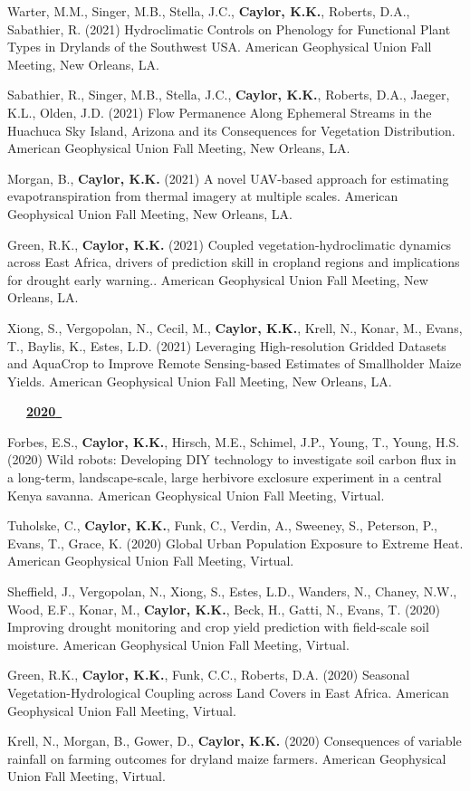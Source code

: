 \begin{etaremune}
\item Warter, M.M., Singer, M.B., Stella, J.C., \textbf{ Caylor, K.K.}, Roberts, D.A., Sabathier, R. (2021) Hydroclimatic Controls on Phenology for Functional Plant Types in Drylands of the Southwest USA. American Geophysical Union Fall Meeting, New Orleans, LA.
\item Sabathier, R., Singer, M.B., Stella, J.C., \textbf{ Caylor, K.K.}, Roberts, D.A., Jaeger, K.L., Olden, J.D. (2021) Flow Permanence Along Ephemeral Streams in the Huachuca Sky Island, Arizona and its Consequences for Vegetation Distribution. American Geophysical Union Fall Meeting, New Orleans, LA.
\item Morgan, B., \textbf{ Caylor, K.K.} (2021) A novel UAV-based approach for estimating evapotranspiration from thermal imagery at multiple scales. American Geophysical Union Fall Meeting, New Orleans, LA.
\item Green, R.K., \textbf{ Caylor, K.K.} (2021) Coupled vegetation-hydroclimatic dynamics across East Africa, drivers of prediction skill in cropland regions and implications for drought early warning.. American Geophysical Union Fall Meeting, New Orleans, LA.
\item Xiong, S., Vergopolan, N., Cecil, M., \textbf{ Caylor, K.K.}, Krell, N., Konar, M., Evans, T., Baylis, K., Estes, L.D. (2021) Leveraging High-resolution Gridded Datasets and AquaCrop to Improve Remote Sensing-based Estimates of Smallholder Maize Yields. American Geophysical Union Fall Meeting, New Orleans, LA.

\vspace{0.1in}
\mbox{\ \ \ \underline{\textbf{2020 }}}
\vspace{0.1in}

\item Forbes, E.S., \textbf{ Caylor, K.K.}, Hirsch, M.E., Schimel, J.P., Young, T., Young, H.S. (2020) Wild robots: Developing DIY technology to investigate soil carbon flux in a long-term, landscape-scale, large herbivore exclosure experiment in a central Kenya savanna. American Geophysical Union Fall Meeting, Virtual.
\item Tuholske, C., \textbf{ Caylor, K.K.}, Funk, C., Verdin, A., Sweeney, S., Peterson, P., Evans, T., Grace, K. (2020) Global Urban Population Exposure to Extreme Heat. American Geophysical Union Fall Meeting, Virtual.
\item Sheffield, J., Vergopolan, N., Xiong, S., Estes, L.D., Wanders, N., Chaney, N.W., Wood, E.F., Konar, M., \textbf{ Caylor, K.K.}, Beck, H., Gatti, N., Evans, T. (2020) Improving drought monitoring and crop yield prediction with field-scale soil moisture. American Geophysical Union Fall Meeting, Virtual.
\item Green, R.K., \textbf{ Caylor, K.K.}, Funk, C.C., Roberts, D.A. (2020) Seasonal Vegetation-Hydrological Coupling across Land Covers in East Africa. American Geophysical Union Fall Meeting, Virtual.
\item Krell, N., Morgan, B., Gower, D., \textbf{ Caylor, K.K.} (2020) Consequences of variable rainfall on farming outcomes for dryland maize farmers. American Geophysical Union Fall Meeting, Virtual.


\end{etaremune}
